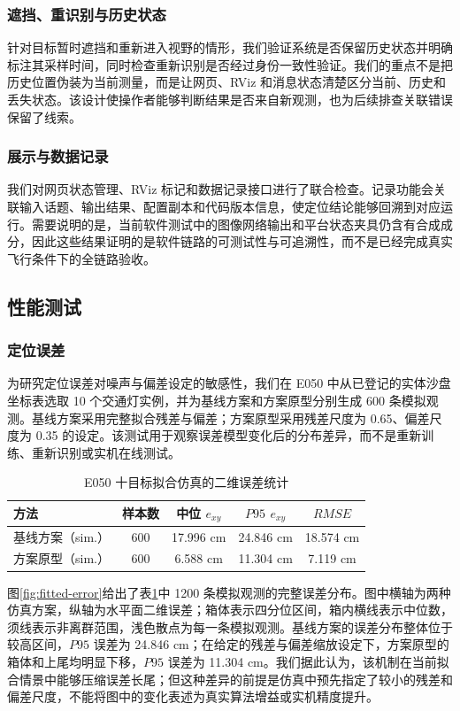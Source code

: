 \documentclass[UTF8,a4paper,12pt]{ctexart}
\begin{document}
\subsubsection{遮挡、重识别与历史状态}
针对目标暂时遮挡和重新进入视野的情形，我们验证系统是否保留历史状态并明确标注其采样时间，同时检查重新识别是否经过身份一致性验证。我们的重点不是把历史位置伪装为当前测量，而是让网页、RViz 和消息状态清楚区分当前、历史和丢失状态。该设计使操作者能够判断结果是否来自新观测，也为后续排查关联错误保留了线索。

\subsubsection{展示与数据记录}
我们对网页状态管理、RViz 标记和数据记录接口进行了联合检查。记录功能会关联输入话题、输出结果、配置副本和代码版本信息，使定位结论能够回溯到对应运行。需要说明的是，当前软件测试中的图像网络输出和平台状态夹具仍含有合成成分，因此这些结果证明的是软件链路的可测试性与可追溯性，而不是已经完成真实飞行条件下的全链路验收。

\subsection{性能测试}
\subsubsection{定位误差}
为研究定位误差对噪声与偏差设定的敏感性，我们在 E050 中从已登记的实体沙盘坐标表选取 10 个交通灯实例，并为基线方案和方案原型分别生成 600 条模拟观测。基线方案采用完整拟合残差与偏差；方案原型采用残差尺度为 0.65、偏差尺度为 0.35 的设定。该测试用于观察误差模型变化后的分布差异，而不是重新训练、重新识别或实机在线测试。

\begin{table}[htbp]
  \centering
  \caption{E050 十目标拟合仿真的二维误差统计}\label{tab:fitted-simulation}
  \begin{tabular}{p{3.3cm}cccc}
    \toprule
    方法 & 样本数 & 中位 $e_{xy}$ & $P95$ $e_{xy}$ & $RMSE$ \\
    \midrule
    基线方案（sim.） & 600 & 17.996 cm & 24.846 cm & 18.574 cm \\
    方案原型（sim.） & 600 & 6.588 cm & 11.304 cm & 7.119 cm \\
    \bottomrule
  \end{tabular}
\end{table}

图\ref{fig:fitted-error}给出了表\ref{tab:fitted-simulation}中 1200 条模拟观测的完整误差分布。图中横轴为两种仿真方案，纵轴为水平面二维误差；箱体表示四分位区间，箱内横线表示中位数，须线表示非离群范围，浅色散点为每一条模拟观测。基线方案的误差分布整体位于较高区间，$P95$ 误差为 24.846 cm；在给定的残差与偏差缩放设定下，方案原型的箱体和上尾均明显下移，$P95$ 误差为 11.304 cm。我们据此认为，该机制在当前拟合情景中能够压缩误差长尾；但这种差异的前提是仿真中预先指定了较小的残差和偏差尺度，不能将图中的变化表述为真实算法增益或实机精度提升。
\end{document}
